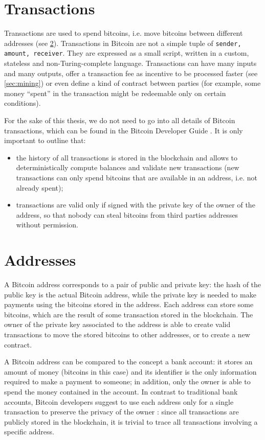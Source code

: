\section{Transactions}
Transactions are used to spend bitcoins, i.e. move bitcoins between different addresses (see \cref{sec:addresses}).
Transactions in Bitcoin are not a simple tuple of \texttt{\textlangle sender, amount, receiver\textrangle}.
They are expressed as a small script, written in a custom, stateless and non-Turing-complete language.
Transactions can have many inputs and many outputs, offer a transaction fee as incentive to be processed faster (see \cref{sec:mining}) or even define a kind of contract between parties (for example, some money ``spent'' in the transaction might be redeemable only on certain conditions).

For the sake of this thesis, we do not need to go into all details of Bitcoin transactions, which can be found in the Bitcoin Developer Guide \cite{bitcoin_guide}.
It is only important to outline that:
\begin{itemize}
	\item the history of all transactions is stored in the blockchain and allows to deterministically compute balances and validate new transactions (new transactions can only spend bitcoins that are available in an address, i.e. not already spent);
	\item transactions are valid only if signed with the private key of the owner of the address, so that nobody can steal bitcoins from third parties addresses without permission.
\end{itemize}

\section{Addresses}
\label{sec:addresses}
A Bitcoin address corresponds to a pair of public and private key: the hash of the public key is the actual Bitcoin address, while the private key is needed to make payments using the bitcoins stored in the address.
Each address can store some bitcoins, which are the result of some transaction stored in the blockchain.
The owner of the private key associated to the address is able to create valid transactions to move the stored bitcoins to other addresses, or to create a new contract.

A Bitcoin address can be compared to the concept a bank account:
it stores an amount of money (bitcoins in this case) and its identifier is the only information required to make a payment to someone;
in addition, only the owner is able to spend the money contained in the account.
In contrast to traditional bank accounts, Bitcoin developers suggest to use each address only for a single transaction to preserve the privacy of the owner \cite{bitcoin_guide}:
since all transactions are publicly stored in the blockchain, it is trivial to trace all transactions involving a specific address.

